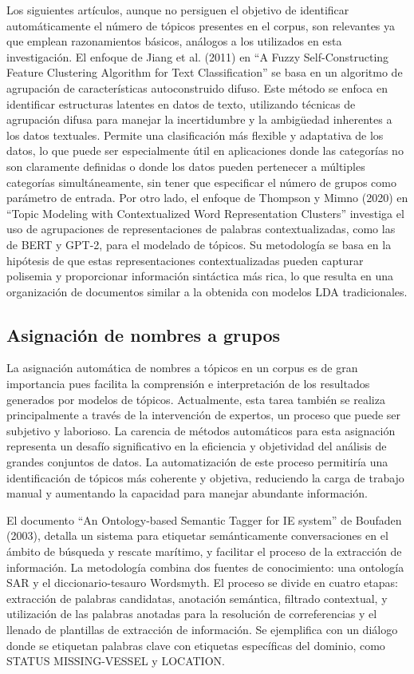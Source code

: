 Los siguientes art\'iculos, aunque no persiguen el objetivo de identificar autom\'aticamente el n\'umero de t\'opicos presentes en el corpus, son relevantes ya que emplean razonamientos b\'asicos, an\'alogos a los utilizados en esta investigaci\'on. El enfoque de Jiang et al. (2011) en ``A Fuzzy Self-Constructing Feature Clustering Algorithm for Text Classification'' se basa en un algoritmo de agrupación de características autoconstruido difuso. Este método se enfoca en identificar estructuras latentes en datos de texto, utilizando técnicas de agrupación difusa para manejar la incertidumbre y la ambigüedad inherentes a los datos textuales. Permite una clasificación más flexible y adaptativa de los datos, lo que puede ser especialmente útil en aplicaciones donde las categorías no son claramente definidas o donde los datos pueden pertenecer a múltiples categorías simultáneamente, sin tener que especificar el n\'umero de grupos como par\'ametro de entrada. Por otro lado, el enfoque de Thompson y Mimno (2020) en ``Topic Modeling with Contextualized Word Representation Clusters'' investiga el uso de agrupaciones de representaciones de palabras contextualizadas, como las de BERT y GPT-2, para el modelado de tópicos. Su metodología se basa en la hipótesis de que estas representaciones contextualizadas pueden capturar polisemia y proporcionar información sintáctica más rica, lo que resulta en una organización de documentos similar a la obtenida con modelos LDA tradicionales.

\subsection{Asignaci\'on de nombres a grupos}

La asignación automática de nombres a tópicos en un corpus es de gran importancia pues facilita la comprensión e interpretación de los resultados generados por modelos de tópicos. Actualmente, esta tarea tambi\'en se realiza principalmente a través de la intervención de expertos, un proceso que puede ser subjetivo y laborioso. La carencia de métodos automáticos para esta asignación representa un desafío significativo en la eficiencia y objetividad del análisis de grandes conjuntos de datos. La automatización de este proceso permitiría una identificación de tópicos más coherente y objetiva, reduciendo la carga de trabajo manual y aumentando la capacidad para manejar abundante informaci\'on.

El documento ``An Ontology-based Semantic Tagger for IE system'' de Boufaden (2003), detalla un sistema para etiquetar semánticamente conversaciones en el ámbito de búsqueda y rescate marítimo, y facilitar el proceso de la extracci\'on de informaci\'on. La metodología combina dos fuentes de conocimiento: una ontología SAR y el diccionario-tesauro Wordsmyth. El proceso se divide en cuatro etapas: extracción de palabras candidatas, anotación semántica, filtrado contextual, y utilización de las palabras anotadas para la resolución de correferencias y el llenado de plantillas de extracción de información. Se ejemplifica con un diálogo donde se etiquetan palabras clave con etiquetas específicas del dominio, como STATUS MISSING-VESSEL y LOCATION. 

